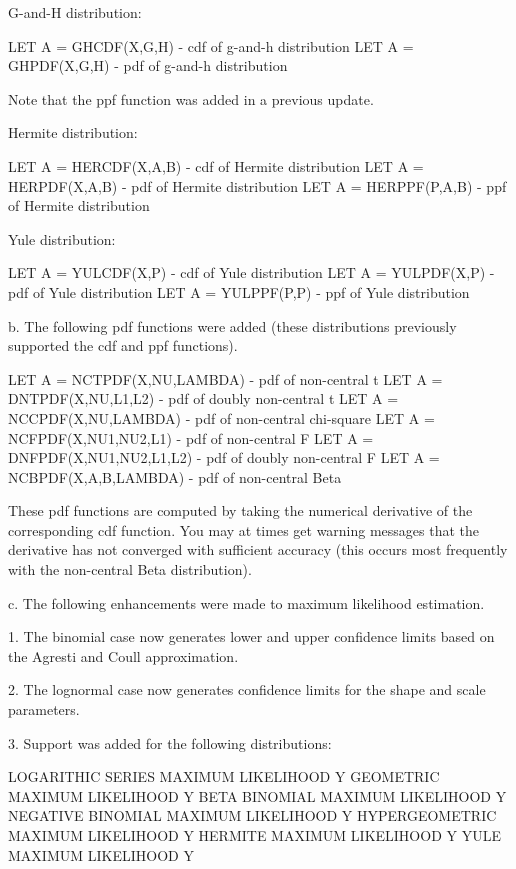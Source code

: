 {       G-and-H distribution:

       LET A = GHCDF(X,G,H)           - cdf of g-and-h distribution
       LET A = GHPDF(X,G,H)           - pdf of g-and-h distribution

       Note that the ppf function was added in a previous update.

       Hermite distribution:

       LET A = HERCDF(X,A,B)          - cdf of Hermite distribution
       LET A = HERPDF(X,A,B)          - pdf of Hermite distribution
       LET A = HERPPF(P,A,B)          - ppf of Hermite distribution

       Yule distribution:

       LET A = YULCDF(X,P)            - cdf of Yule distribution
       LET A = YULPDF(X,P)            - pdf of Yule distribution
       LET A = YULPPF(P,P)            - ppf of Yule distribution

    b. The following pdf functions were added (these distributions
       previously supported the cdf and ppf functions).

       LET A = NCTPDF(X,NU,LAMBDA)      - pdf of non-central t
       LET A = DNTPDF(X,NU,L1,L2)       - pdf of doubly non-central t
       LET A = NCCPDF(X,NU,LAMBDA)      - pdf of non-central chi-square
       LET A = NCFPDF(X,NU1,NU2,L1)     - pdf of non-central F
       LET A = DNFPDF(X,NU1,NU2,L1,L2)  - pdf of doubly non-central F
       LET A = NCBPDF(X,A,B,LAMBDA)     - pdf of non-central Beta

       These pdf functions are computed by taking the numerical
       derivative of the corresponding cdf function.  You may
       at times get warning messages that the derivative has not
       converged with sufficient accuracy (this occurs most frequently
       with the non-central Beta distribution).

    c. The following enhancements were made to maximum likelihood
       estimation.

       1. The binomial case now generates lower and upper confidence
          limits based on the Agresti and Coull approximation.

       2. The lognormal case now generates confidence limits for
          the shape and scale parameters.

       3. Support was added for the following distributions:

            LOGARITHIC SERIES MAXIMUM LIKELIHOOD Y
            GEOMETRIC MAXIMUM LIKELIHOOD Y
            BETA BINOMIAL MAXIMUM LIKELIHOOD Y
            NEGATIVE BINOMIAL MAXIMUM LIKELIHOOD Y
            HYPERGEOMETRIC MAXIMUM LIKELIHOOD Y
            HERMITE MAXIMUM LIKELIHOOD Y
            YULE MAXIMUM LIKELIHOOD Y

}
